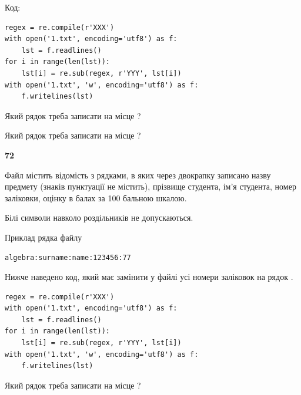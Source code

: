 Код:



\begin{verbatim}
regex = re.compile(r'XXX')
with open('1.txt', encoding='utf8') as f:
    lst = f.readlines()
for i in range(len(lst)):
    lst[i] = re.sub(regex, r'YYY', lst[i])
with open('1.txt', 'w', encoding='utf8') as f:
    f.writelines(lst)
\end{verbatim}









Який рядок треба записати на місце  ?\par
\vspace{5mm}


Який рядок треба записати на місце  ?\par


\newpage

{\begin {center}\textbf{ 72}\end {center}}\par
Файл  містить відомість з рядками, в яких через двокрапку записа\-но назву предмету (знаків пунктуації не містить), прізвище студента, ім'я студента, номер залі\-ков\-ки, оцінку в балах за 100 бальною шкалою.

Білі символи навколо роздільників не допускаються.

Приклад рядка файлу



\begin{verbatim}
algebra:surname:name:123456:77
\end{verbatim}


Нижче наведено код, який має замінити у файлі усі номери заліковок на рядок \code{***}.



\begin{verbatim}
regex = re.compile(r'XXX')
with open('1.txt', encoding='utf8') as f:
    lst = f.readlines()
for i in range(len(lst)):
    lst[i] = re.sub(regex, r'YYY', lst[i])
with open('1.txt', 'w', encoding='utf8') as f:
    f.writelines(lst)
\end{verbatim}







Який рядок треба записати на місце  ?\par
\vspace{5mm}


